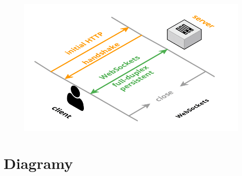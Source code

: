 \documentclass{sprawozdanie-agh}
\begin{document}
		\begin{figure}[H]
			\centering
			\includegraphics[scale=0.5]{websockets.png}
		\end{figure}
		
	\section{Diagramy}
\end{document}

